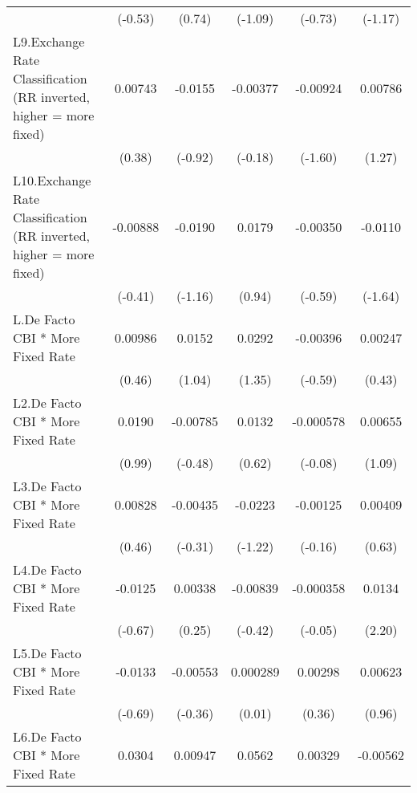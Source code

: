 {\begin{longtable}{l*{5}{c}}
                &  (-0.53)         &   (0.74)         &  (-1.09)         &  (-0.73)         &  (-1.17)         \\
[1em]
L9.Exchange Rate Classification (RR inverted, higher = more fixed)&  0.00743         &  -0.0155         & -0.00377         & -0.00924         &  0.00786         \\
                &   (0.38)         &  (-0.92)         &  (-0.18)         &  (-1.60)         &   (1.27)         \\
[1em]
L10.Exchange Rate Classification (RR inverted, higher = more fixed)& -0.00888         &  -0.0190         &   0.0179         & -0.00350         &  -0.0110         \\
                &  (-0.41)         &  (-1.16)         &   (0.94)         &  (-0.59)         &  (-1.64)         \\
[1em]
L.De Facto CBI * More Fixed Rate&  0.00986         &   0.0152         &   0.0292         & -0.00396         &  0.00247         \\
                &   (0.46)         &   (1.04)         &   (1.35)         &  (-0.59)         &   (0.43)         \\
[1em]
L2.De Facto CBI * More Fixed Rate&   0.0190         & -0.00785         &   0.0132         &-0.000578         &  0.00655         \\
                &   (0.99)         &  (-0.48)         &   (0.62)         &  (-0.08)         &   (1.09)         \\
[1em]
L3.De Facto CBI * More Fixed Rate&  0.00828         & -0.00435         &  -0.0223         & -0.00125         &  0.00409         \\
                &   (0.46)         &  (-0.31)         &  (-1.22)         &  (-0.16)         &   (0.63)         \\
[1em]
L4.De Facto CBI * More Fixed Rate&  -0.0125         &  0.00338         & -0.00839         &-0.000358         &   0.0134\sym{*}  \\
                &  (-0.67)         &   (0.25)         &  (-0.42)         &  (-0.05)         &   (2.20)         \\
[1em]
L5.De Facto CBI * More Fixed Rate&  -0.0133         & -0.00553         & 0.000289         &  0.00298         &  0.00623         \\
                &  (-0.69)         &  (-0.36)         &   (0.01)         &   (0.36)         &   (0.96)         \\
[1em]
L6.De Facto CBI * More Fixed Rate&   0.0304         &  0.00947         &   0.0562\sym{**} &  0.00329         & -0.00562         \\

\end{longtable}}
